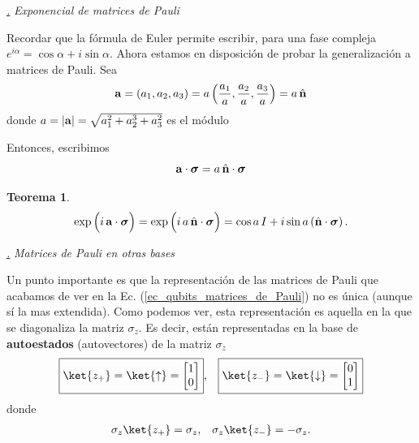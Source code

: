 \documentclass[a4paper,11pt]{book} %
\newtheorem{teorema_contador}{Teorema}
\newcommand{\Teorema}[1]{
		\begin{mybox_gray2}{}
			\begin{teorema_contador}
				 #1 
			\end{teorema_contador} 
		\end{mybox_gray2}
	}
\numberwithin{equation}{chapter}
\def\subsubiContadorIt{\par\addtocounter{subsubsection}{1}\underline{\it\thesubsubsection.}\hskip0.5cm \setcounter{subsubsubsectionIt}{0}}
\newcommand{\SubsubiIt}[1]{
		\subsubiContadorIt \textit{#1}
	}
\newcounter{subsubsubsectionIt}[subsubsection]
\begin{document}
			\SubsubiIt{Exponencial de matrices de Pauli}

Recordar que la fórmula de Euler permite escribir, para una fase compleja $ e^{i\alpha} = \cos\alpha + i \sin\alpha $. Ahora estamos en disposición de probar la generalización a matrices de Pauli.  Sea 
\begin{equation}
{\bf a} = (a_1,a_2,a_3) =a \left( \frac{a_1}{a},\frac{a_2}{a},\frac{a_3}{a}\right) =  a\, \hat{\bf n}
\end{equation} 
donde $a=|{\bf a}|=\sqrt{a_1^2+a_2^3+a_3^2}$ es el módulo

Entonces, escribimos
\begin{equation}
 {\bf a} \cdot \boldsymbol{\sigma} =  a\, \hat{\bf n} \cdot \boldsymbol{\sigma}
\end{equation}

	\Teorema{
		\begin{equation}
		\exp \left( \rule{0mm}{4mm} i\,   {\bf a} \cdot \boldsymbol{\sigma}  \right) = \exp \left( \rule{0mm}{4mm} i\,   a\, \hat{\bf n} \cdot \boldsymbol{\sigma}  \right) = \cos a \, I + i \sin a \,(\hat{\bf n} \cdot  \boldsymbol{\sigma}) \, .
		\end{equation}
	}

			\SubsubiIt{Matrices de Pauli en otras bases}

Un punto importante es que la representación de las matrices de Pauli que acabamos de ver en la Ec. (\ref{ec_qubits_matrices_de_Pauli}) no es única (aunque sí la mas extendida). Como podemos ver, esta representación es aquella en la que se diagonaliza la matriz $\sigma_z$. Es decir, están representadas en la base de \textbf{autoestados} (autovectores) de la matriz $\sigma_z$
\begin{align*}
& \boxed{\ket{z_+} = \ket{\uparrow} = \begin{bmatrix}  1 \\ 0  \end{bmatrix}},
& \boxed{\ket{z_-} = \ket{\downarrow} = \begin{bmatrix}  0 \\ 1  \end{bmatrix}}
\end{align*}
donde
\begin{align*}
& \sigma_z \ket{z_+} =   \sigma_z, 
& \sigma_z \ket{z_-} = - \sigma_z.
\end{align*}
\end{document}

